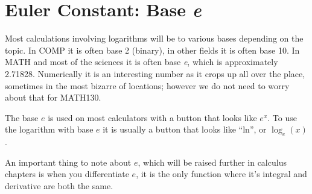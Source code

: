 \section{Euler Constant: Base \emph{e}}
\label{sec:EulerConstantBaseE}
Most calculations involving logarithms will be to various bases depending on
the topic. In COMP it is often base 2 (binary), in other fields it is often base
10. In MATH and most of the sciences it is often base \emph{e}, which is
approximately 2.71828.\cite{duWGx} Numerically it is an interesting number as it
crops up all over the place, sometimes in the most bizarre of locations; however
we do not need to worry about that for MATH130.

The base $e$ is used on most calculators with a button that looks like $e^x$. To
use the logarithm with base $e$ it is usually a button that looks like ``ln'', or
$\log_e(x)$.

An important thing to note about $e$, which will be raised further in calculus
chapters is when you differentiate $e$, it is the only function where it's
integral and derivative are both the same.   